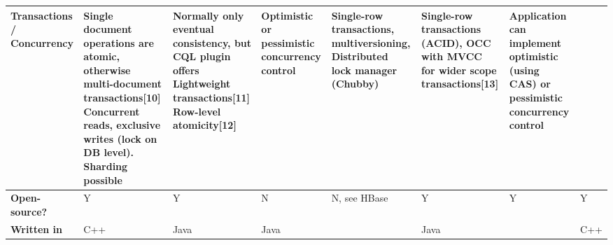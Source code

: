 \documentclass{article}
\begin{document}
\begin{table}[h]
\begin{tabular}{@{}l| L{3cm}| L{3cm}| L{3cm}| L{3cm}| L{3cm}| L{3cm}| L{3cm}|@{}}
\textbf{Transactions / Concurrency} & Single document operations are atomic, otherwise multi-document transactions{[}10{]} Concurrent reads, exclusive writes (lock on DB level). Sharding possible & Normally only eventual consistency, but CQL plugin offers Lightweight transactions{[}11{]} Row-level atomicity{[}12{]} & Optimistic or pessimistic concurrency control & Single-row transactions, multiversioning, Distributed lock manager (Chubby) & Single-row transactions (ACID), OCC with MVCC for wider scope transactions{[}13{]} & Application can implement optimistic (using CAS) or pessimistic concurrency control &                                     \\ \midrule
\textbf{Open-source?}               & Y                                                                                                                                                               & Y                                                                                                                        & N                                             & N, see HBase                                                                & Y                                                                                  & Y                                                                                   & Y                                   \\ \midrule
\textbf{Written in}                 & C++                                                                                                                                                             & Java                                                                                                                     & Java                                          &                                                                             & Java                                                                               &                                                                                     & C++                                 \\ \bottomrule
\end{tabular}
\end{table}

\end{document}
